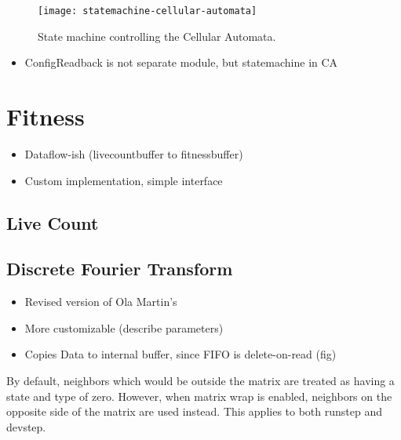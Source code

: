 \begin{figure}[!ht]
    \centering
    \texttt{[image: statemachine-cellular-automata]}
    \caption[Cellular Automata state machine]{
        State machine controlling the Cellular Automata.
    }
    \label{fig:statemachine-cellular-automata}
\end{figure}

\begin{itemize}
    \item ConfigReadback is not separate module, but statemachine in CA
\end{itemize}

\section{Fitness}

\begin{itemize}
    \item Dataflow-ish (livecountbuffer to fitnessbuffer)
    \item Custom implementation, simple interface
\end{itemize}

\subsection{Live Count}


\subsection{Discrete Fourier Transform}

\begin{itemize}
    \item Revised version of Ola Martin's
    \item More customizable (describe parameters)
    \item Copies Data to internal buffer, since FIFO is delete-on-read (fig)
\end{itemize}

By default, neighbors which would be outside the matrix are treated as having a state and type of zero.
However, when matrix wrap is enabled, neighbors on the opposite side of the matrix are used instead.
This applies to both runstep and devstep.
